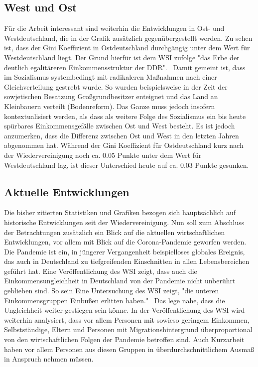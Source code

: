 \documentclass[a4paper,12pt]{article}
\begin{document}
\subsection*{West und Ost}

Für die Arbeit interessant sind weiterhin die Entwicklungen in Ost- und Westdeutschland, die in der Grafik zusätzlich gegenübergestellt werden. Zu sehen ist, dass der Gini Koeffizient in Ostdeutschland durchgängig unter dem Wert für Westdeutschland liegt. Der Grund
hierfür ist dem WSI zufolge "das Erbe der deutlich egalitäreren Einkommensstruktur der DDR".\ \cite{wsi_2024} Damit gemeint ist, dass im Sozialismus systembedingt mit radikaleren Maßnahmen nach einer Gleichverteilung gestrebt wurde. So wurden beispielsweise in der Zeit der 
sowjetischen Besatzung Großgrundbesitzer enteignet und das Land an Kleinbauern verteilt (Bodenreform).
Das Ganze muss jedoch insofern kontextualisiert werden, als dass als weitere Folge des Sozialismus ein bis heute spürbares Einkommensgefälle zwischen Ost und West besteht. \cite{gebauer_martens_2020}
Es ist jedoch anzumerken, dass die Differenz zwischen Ost und West in den letzten Jahren abgenommen hat. Während der Gini Koeffizient für Ostdeutschland kurz nach der Wiedervereinigung noch ca. 0.05 Punkte unter dem Wert für Westdeutschland lag, ist dieser Unterschied heute auf ca. 0.03 Punkte gesunken.

\subsection*{Aktuelle Entwicklungen}
Die bisher zitierten Statistiken und Grafiken bezogen sich hauptsächlich auf historische Entwicklungen seit der Wiedervereinigung. Nun soll zum Abschluss der Betrachtungen zusätzlich ein Blick auf die aktuellen wirtschaftlichen Entwicklungen, vor allem mit Blick auf die Corona-Pandemie geworfen werden.
Die Pandemie ist ein, in jüngerer Vergangenheit beispielloses globales Ereignis, das auch in Deutschland zu tiefgreifenden Einschnitten in allen Lebensbereichen geführt hat. Eine Veröffentlichung des WSI zeigt, dass auch die Einkommensungleichheit in Deutschland von der Pandemie nicht unberührt geblieben sind. So sein Eine Untersuchung des WSI zeigt, "die unteren Einkommensgruppen Einbußen erlitten haben."\ \cite{kohlrausch_zucco_hövermann_2020} Das lege nahe, dass die Ungleichheit weiter gestiegen sein könne. In der Veröffentlichung des WSI wird weiterhin analysiert, dass vor allem Personen mit sowieso geringem Einkommen, Selbstständige, Eltern und Personen mit Migrationshintergrund überproportional von den wirtschaftlichen Folgen der Pandemie betroffen sind. Auch Kurzarbeit haben vor allem Personen aus diesen Gruppen in überdurchschnittlichem Ausmaß in Anspruch nehmen müssen. \cite{kohlrausch_zucco_hövermann_2020}
\end{document}
